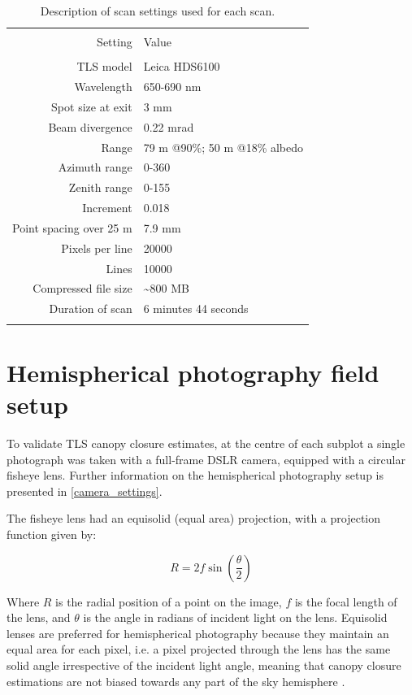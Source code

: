 \documentclass[11pt,a4paper]{article}
\begin{document}
\begin{table} \centering 
  \caption{Description of scan settings used for each scan.} 
  \label{scan_settings} 
\begin{tabular}{@{\extracolsep{0pt}} rl} 
\\[-1.8ex]\hline 
\hline \\[-1.8ex] 
{Setting} & {Value} \\
\hline \\[-1.8ex] 
TLS model & Leica HDS6100 \\
Wavelength & 650-690 nm \\
Spot size at exit & 3 mm \\
Beam divergence & 0.22 mrad \\
Range & 79 m @90\%; 50 m @18\% albedo \\
Azimuth range & 0-360\textdegree{} \\
Zenith range & 0-155\textdegree{} \\
Increment & 0.018\textdegree{} \\
Point spacing over 25 m & 7.9 mm \\
Pixels per line & \num{20000} \\
Lines & \num{10000} \\
Compressed file size & \textasciitilde{}800 MB \\
Duration of scan & 6 minutes 44 seconds \\
\hline
\hline \\[-1.8ex] 
\end{tabular} 
\end{table} 


\section{Hemispherical photography field setup}

To validate TLS canopy closure estimates, at the centre of each subplot a single photograph was taken with a full-frame DSLR camera, equipped with a circular fisheye lens. Further information on the hemispherical photography setup is presented in \autoref{camera_settings}.

The fisheye lens had an equisolid (equal area) projection, with a projection function given by: 

\begin{equation}
	R = 2f \sin{(\frac{\theta{}}{2})}
\end{equation}

Where $R$ is the radial position of a point on the image, $f$ is the focal length of the lens, and $\theta{}$ is the angle in radians of incident light on the lens. Equisolid lenses are preferred for hemispherical photography because they maintain an equal area for each pixel, i.e. a pixel projected through the lens has the same solid angle irrespective of the incident light angle, meaning that canopy closure estimations are not biased towards any part of the sky hemisphere \citep{Herbert1987}.
\end{document}
